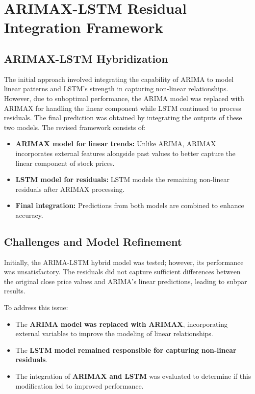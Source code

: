 \section{ARIMAX-LSTM Residual Integration Framework}
\subsection{ARIMAX-LSTM Hybridization}

The initial approach involved integrating the capability of ARIMA to model linear patterns and LSTM's strength in capturing non-linear relationships. However, due to suboptimal performance, the ARIMA model was replaced with ARIMAX for handling the linear component while LSTM continued to process residuals. The final prediction was obtained by integrating the outputs of these two models. The revised framework consists of:

\begin{itemize}
    \item \textbf{ARIMAX model for linear trends:} Unlike ARIMA, ARIMAX incorporates external features alongside past values to better capture the linear component of stock prices.
    \item \textbf{LSTM model for residuals:} LSTM models the remaining non-linear residuals after ARIMAX processing.
    \item \textbf{Final integration:} Predictions from both models are combined to enhance accuracy.
\end{itemize}

\subsection{Challenges and Model Refinement}

Initially, the ARIMA-LSTM hybrid model was tested; however, its performance was unsatisfactory. The residuals did not capture sufficient differences between the original close price values and ARIMA’s linear predictions, leading to subpar results. 

To address this issue:
\begin{itemize}
    \item The \textbf{ARIMA model was replaced with ARIMAX}, incorporating external variables to improve the modeling of linear relationships.
    \item The \textbf{LSTM model remained responsible for capturing non-linear residuals}.
    \item The integration of \textbf{ARIMAX and LSTM} was evaluated to determine if this modification led to improved performance.
\end{itemize}

